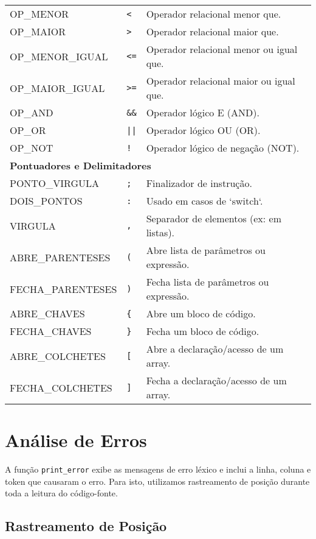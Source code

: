 \documentclass[12pt,a4paper]{article}
\begin{document}
\begin{longtable}{lll}
OP\_MENOR & \texttt{<} & Operador relacional menor que. \\
OP\_MAIOR & \texttt{>} & Operador relacional maior que. \\
OP\_MENOR\_IGUAL & \texttt{<=} & Operador relacional menor ou igual que. \\
OP\_MAIOR\_IGUAL & \texttt{>=} & Operador relacional maior ou igual que. \\
OP\_AND & \texttt{\&\&} & Operador lógico E (AND). \\
OP\_OR & \texttt{||} & Operador lógico OU (OR). \\
OP\_NOT & \texttt{!} & Operador lógico de negação (NOT). \\
\midrule
\multicolumn{3}{l}{\textbf{Pontuadores e Delimitadores}} \\
\midrule
PONTO\_VIRGULA & \texttt{;} & Finalizador de instrução. \\
DOIS\_PONTOS & \texttt{:} & Usado em casos de `switch`. \\
VIRGULA & \texttt{,} & Separador de elementos (ex: em listas). \\
ABRE\_PARENTESES & \texttt{(} & Abre lista de parâmetros ou expressão. \\
FECHA\_PARENTESES & \texttt{)} & Fecha lista de parâmetros ou expressão. \\
ABRE\_CHAVES & \texttt{\{} & Abre um bloco de código. \\
FECHA\_CHAVES & \texttt{\}} & Fecha um bloco de código. \\
ABRE\_COLCHETES & \texttt{[} & Abre a declaração/acesso de um array. \\
FECHA\_COLCHETES & \texttt{]} & Fecha a declaração/acesso de um array. \\
\end{longtable}


\section{Análise de Erros}
\label{sec:err}

A função \texttt{print\_error} exibe as mensagens de erro léxico e inclui a linha, coluna e token que causaram o erro. Para isto, utilizamos rastreamento de posição durante toda a leitura do código-fonte.

\subsection{Rastreamento de Posição}
\end{document}
